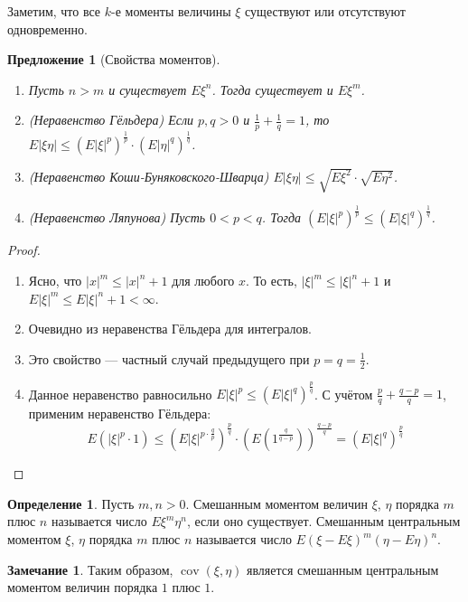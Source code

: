 \documentclass[11pt,openany,a4paper]{scrartcl}
\theoremstyle{plain}
\newtheorem{proposition}[theorem]{Предложение}
\theoremstyle{definition}
\newtheorem{definition}[theorem]{Определение}
\newtheorem{remark}[theorem]{Замечание}
\DeclareMathOperator{\cov}{cov}
\begin{document}
Заметим, что все $k$-е моменты величины $\xi$ существуют или отсутствуют одновременно.

\begin{proposition}[Свойства моментов]
\mbox{}
    \begin{enumerate}
        \item Пусть $n > m$ и существует $E\xi^n$. Тогда существует и $E\xi^m$.
        \item (Неравенство Гёльдера) Если $p, q > 0$ и
        $\frac{1}{p} + \frac{1}{q} = 1$, то $E|\xi\eta| \leqslant
        (E|\xi|^p)^\frac{1}{p} \cdot (E|\eta|^q)^\frac{1}{q}$.
        \item (Неравенство Коши-Буняковского-Шварца)
        $E|\xi\eta| \leqslant \sqrt{E\xi^2} \cdot \sqrt{E\eta^2}$.
        \item (Неравенство Ляпунова) Пусть $0 < p < q$. Тогда
        $(E|\xi|^p)^\frac{1}{p} \leqslant (E|\xi|^q)^\frac{1}{q}$.
    \end{enumerate}
\end{proposition}
\begin{proof}
\mbox{}
    \begin{enumerate}
        \item Ясно, что $|x|^m \leqslant |x|^n + 1$ для любого $x$. То есть,
        $|\xi|^m \leqslant |\xi|^n + 1$ и
        $E|\xi|^m \leqslant E|\xi|^n + 1 < \infty$.
        \item Очевидно из неравенства Гёльдера для интегралов.
        \item Это свойство — частный случай предыдущего при $p = q = \frac{1}{2}$.
        \item Данное неравенство равносильно
        $E|\xi|^p \leqslant (E|\xi|^q)^\frac{p}{q}$. С учётом
        $\frac{p}{q} + \frac{q - p}{q} = 1$, применим неравенство Гёльдера:
        $$
        E(|\xi|^p \cdot 1) \leqslant (E|\xi|^{p \cdot \frac{q}{p}})^\frac{p}{q}\cdot
        (E (1^\frac{q}{q - p}))^\frac{q - p}{q} = (E|\xi|^q)^\frac{p}{q}
        $$
    \end{enumerate}
\end{proof}

\begin{definition}
    Пусть $m,n > 0$. Смешанным моментом величин $\xi$, $\eta$ порядка $m$ плюс $n$ 
    называется число $E\xi^m\eta^n$, если оно существует. Смешанным центральным 
    моментом $\xi$, $\eta$ порядка $m$ плюс $n$ называется число
    $E(\xi - E\xi)^m(\eta - E\eta)^n$.
\end{definition}
\begin{remark}
    Таким образом, $\cov (\xi, \eta)$ является смешанным центральным моментом
    величин порядка $1$ плюс $1$.
\end{remark}
\end{document}
